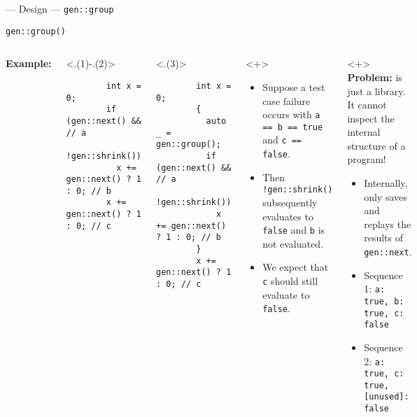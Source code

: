 \begin{frame}[fragile,t]{\halcheck{} --- Design --- \texttt{gen::group}}
  \begin{center}
    \texttt{gen::group()}
  \end{center}

  \begin{columns}[T]
    \textbf{Example:}

    \begin{onlyenv}<.(1)-.(2)>
      \begin{verbatim}
        int x = 0;
        if (gen::next() && // a
            !gen::shrink())
          x += gen::next() ? 1 : 0; // b
        x += gen::next() ? 1 : 0; // c
      \end{verbatim}
    \end{onlyenv}

    \begin{onlyenv}<.(3)>
      \begin{verbatim}
        int x = 0;
        {
          auto _ = gen::group();
          if (gen::next() && // a
              !gen::shrink())
            x += gen::next() ? 1 : 0; // b
        }
        x += gen::next() ? 1 : 0; // c
      \end{verbatim}
    \end{onlyenv}

    \begin{onlyenv}<+>
      \begin{itemize}
        \item Suppose a test case failure occurs with \texttt{a == b == true} and  \texttt{c == false}.
        \item Then \texttt{!gen::shrink()} subsequently evaluates to \texttt{false} and \texttt{b} is not evaluated.
        \item We expect that \texttt{c} should still evaluate to \texttt{false}.
      \end{itemize}
    \end{onlyenv}

    \begin{onlyenv}<+>
      \textbf{Problem:} \halcheck{} is just a library. It cannot inspect the internal structure of a program!
      \begin{itemize}
        \item Internally, \halcheck{} only saves and replays the results of \texttt{gen::next}.
        \item Sequence 1: \texttt{{a: true, b: true, c: false}}
        \item Sequence 2: \texttt{{a: true, c: true, [unused]: false}}
      \end{itemize}
    \end{onlyenv}


\end{columns}
\end{frame}
